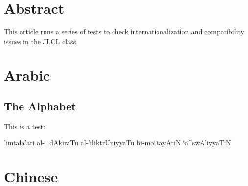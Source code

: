 \documentclass{jlcl}
\title{\articletitle}
\author{AUTHOR NAME\\
AUTHOR INSTITUTION\\
\texttt{AUTHOR EMAIL} \and
AUTHOR 2 NAME\\
AUTHOR 2 INSTITUTION\\
 \texttt{AUTHOR 2 EMAIL}}
\begin{document}
\setarab %
\vocalize %
\transtrue %


\setcounter{page}{1}
\thispagestyle{plain}

\authordata




\section*{Abstract}
This article runs a series of tests to check internationalization and compatibility issues in the JLCL class.



\section{Arabic}

\subsection{The Alphabet}


This is a test: 

\begin{RLtext}'imtala'ati al-_dAkiraTu al-'iliktrUniyyaTu bi-mo`.tayAtiN `a^swA'iyyaTiN\end{RLtext}


\section{Chinese}
\end{document}
